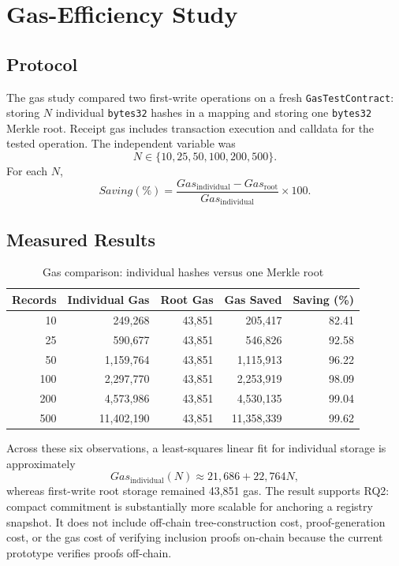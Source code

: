 \section{Gas-Efficiency Study}
\label{sec:gas_results}

\subsection{Protocol}

The gas study compared two first-write operations on a fresh
\texttt{GasTestContract}: storing \(N\) individual \texttt{bytes32} hashes in a
mapping and storing one \texttt{bytes32} Merkle root. Receipt gas includes
transaction execution and calldata for the tested operation. The independent
variable was
\begin{equation}
N\in\{10,25,50,100,200,500\}.
\end{equation}
For each \(N\),
\begin{equation}
Saving(\%)=
\frac{Gas_{\mathrm{individual}}-Gas_{\mathrm{root}}}
{Gas_{\mathrm{individual}}}\times100.
\label{eq:gas_saving_result}
\end{equation}

\subsection{Measured Results}

\begin{table}[htbp]
\centering
\caption{Gas comparison: individual hashes versus one Merkle root}
\label{tab:gas_results}
\begin{tabular}{|r|r|r|r|r|}
\hline
\textbf{Records} & \textbf{Individual Gas} & \textbf{Root Gas} &
\textbf{Gas Saved} & \textbf{Saving (\%)} \\
\hline
10 & 249,268 & 43,851 & 205,417 & 82.41 \\
\hline
25 & 590,677 & 43,851 & 546,826 & 92.58 \\
\hline
50 & 1,159,764 & 43,851 & 1,115,913 & 96.22 \\
\hline
100 & 2,297,770 & 43,851 & 2,253,919 & 98.09 \\
\hline
200 & 4,573,986 & 43,851 & 4,530,135 & 99.04 \\
\hline
500 & 11,402,190 & 43,851 & 11,358,339 & 99.62 \\
\hline
\end{tabular}
\end{table}

Across these six observations, a least-squares linear fit for individual storage
is approximately
\begin{equation}
Gas_{\mathrm{individual}}(N)\approx21,686+22,764N,
\end{equation}
whereas first-write root storage remained 43,851 gas. The result supports RQ2:
compact commitment is substantially more scalable for anchoring a registry
snapshot. It does not include off-chain tree-construction cost, proof-generation
cost, or the gas cost of verifying inclusion proofs on-chain because the current
prototype verifies proofs off-chain.

